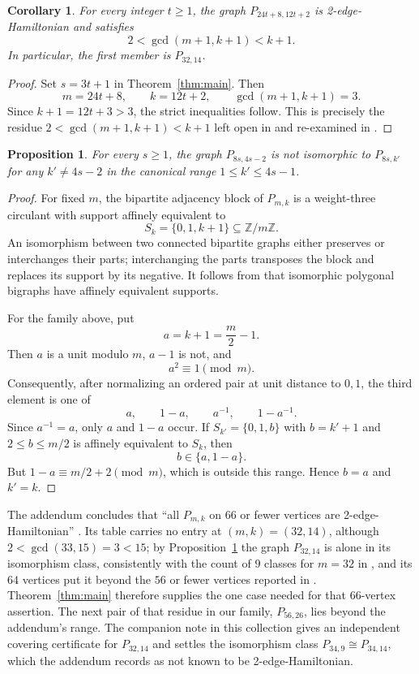 \documentclass[11pt]{amsart}
\newtheorem{corollary}[theorem]{Corollary}
\newtheorem{proposition}[theorem]{Proposition}
\newcommand{\Z}{\mathbb{Z}}
\begin{document}
\begin{corollary}\label{cor:residue}
For every integer $t\geq 1$, the graph $P_{24t+8,12t+2}$ is
2-edge-Hamiltonian and satisfies
\[
  2<\gcd(m+1,k+1)<k+1.
\]
In particular, the first member is $P_{32,14}$.
\end{corollary}

\begin{proof}
Set $s=3t+1$ in Theorem~\ref{thm:main}. Then
\[
  m=24t+8,
  \qquad
  k=12t+2,
  \qquad
  \gcd(m+1,k+1)=3.
\]
Since $k+1=12t+3>3$, the strict inequalities follow. This is precisely
the residue $2<\gcd(m+1,k+1)<k+1$ left open in \cite[p.~109]{Simmons2020}
and re-examined in \cite[p.~102]{Simmons2020a}.
\end{proof}

\begin{proposition}\label{prop:noniso}
For every $s\geq 1$, the graph $P_{8s,4s-2}$ is not isomorphic to
$P_{8s,k'}$ for any $k'\neq 4s-2$ in the canonical range
$1\leq k'\leq 4s-1$.
\end{proposition}

\begin{proof}
For fixed $m$, the bipartite adjacency block of $P_{m,k}$ is a
weight-three circulant with support affinely equivalent to
\[
  S_k=\{0,1,k+1\}\subseteq \Z/m\Z.
\]
An isomorphism between two connected bipartite graphs either preserves or
interchanges their parts; interchanging the parts transposes the block and
replaces its support by its negative. It follows from
\cite[Theorem~1.1]{WiedemannZieve} that isomorphic polygonal bigraphs have
affinely equivalent supports.

For the family above, put
\[
  a=k+1=\frac m2-1.
\]
Then $a$ is a unit modulo $m$, $a-1$ is not, and
\[
  a^2\equiv 1\pmod m.
\]
Consequently, after normalizing an ordered pair at unit distance to
$0,1$, the third element is one of
\[
  a,\qquad 1-a,\qquad a^{-1},\qquad 1-a^{-1}.
\]
Since $a^{-1}=a$, only $a$ and $1-a$ occur. If
$S_{k'}=\{0,1,b\}$ with $b=k'+1$ and
$2\leq b\leq m/2$ is affinely equivalent to $S_k$, then
\[
  b\in\{a,1-a\}.
\]
But $1-a\equiv m/2+2\pmod m$, which is outside this range. Hence
$b=a$ and $k'=k$.
\end{proof}

The addendum concludes that ``all $P_{m,k}$ on 66 or fewer vertices are
2-edge-Hamiltonian'' \cite[p.~103]{Simmons2020a}. Its table
carries no entry at $(m,k)=(32,14)$, although $2<\gcd(33,15)=3<15$; by
Proposition~\ref{prop:noniso} the graph $P_{32,14}$ is alone in its
isomorphism class, consistently with the count of $9$ classes for $m=32$
in \cite[Table~3]{Simmons2020}, and
its $64$ vertices put it beyond the $56$ or fewer
vertices reported in \cite[p.~115]{Simmons2020}.
Theorem~\ref{thm:main} therefore supplies the one case needed for that
66-vertex assertion. The next pair of that residue in our family,
$P_{56,26}$, lies beyond the addendum's range. The companion note
\cite{Companion} in this collection gives an independent covering
certificate for $P_{32,14}$ and settles the isomorphism class
$P_{34,9}\cong P_{34,14}$, which the addendum records as not known to be
2-edge-Hamiltonian.
\end{document}
